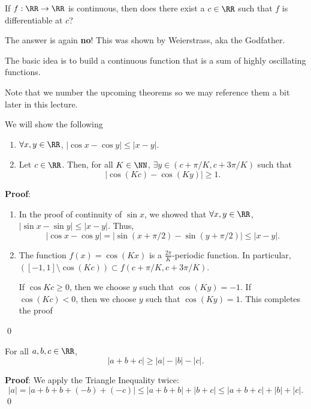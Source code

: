 \begin{question}
If $f:\RR\to \RR$ is continuous, then does there exist a $c\in \RR$ such that $f$ is differentiable at $c$? 
\end{question}
The answer is again \textbf{no}! This was shown by Weierstrass, aka the Godfather.

The basic idea is to build a continuous function that is a sum of highly oscillating functions.

\begin{remark}
Note that we number the upcoming theorems so we may reference them a bit later in this lecture.
\end{remark}
\begin{theorem}[Theorem I]
We will show the following
\begin{enumerate}
    \item $\forall x,y\in \RR$, $|\cos x - \cos y| \leq |x-y|$.
    \item Let $c\in \RR$. Then, for all $K\in \NN$, $\exists y\in (c+\pi /K, c+3\pi/K)$ such that 
    \[
    |\cos(Kc) - \cos(Ky)| \geq 1.
    \]
\end{enumerate}
\end{theorem}
\textbf{Proof}: 
\begin{enumerate}
    \item In the proof of continuity of $\sin x$, we showed that $\forall x,y\in \RR$, $|\sin x - \sin y| \leq |x-y|$. Thus, 
    \[
    |\cos x - \cos y| = |\sin(x+\pi/2) -\sin(y+\pi/2)| \leq |x-y|.
    \]
    \item The function $f(x) = \cos(Kx)$ is a $\frac{2\pi}{K}$-periodic function. In particular, $([-1,1] \setminus \cos(Kc)) \subset f(c+\pi/K, c+3\pi/K)$.
    
    If $\cos Kc\geq 0$, then we choose $y$ such that $\cos(Ky) = -1$. If $\cos (Kc)< 0$, then we choose $y$ such that $\cos(Ky) = 1$. This completes the proof
\end{enumerate} \qed 

\begin{theorem}[Theorem II]
For all $a,b,c\in \RR$,
\[
|a+b+c|\geq |a|-|b|-|c|.
\]
\end{theorem}
\textbf{Proof}: We apply the Triangle Inequality twice:
\[
|a| = |a+b+b+(-b)+(-c)| \leq |a+b+b| + |b+c| \leq |a+b+c| + |b|+|c|.
\] \qed 

